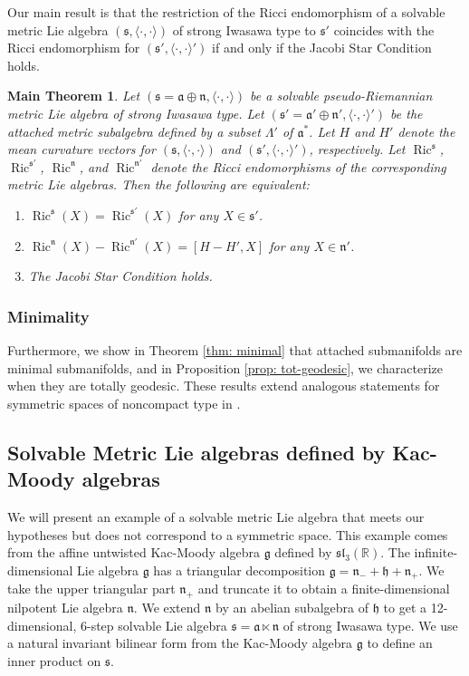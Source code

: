\documentclass[12pt]{amsart}
\newcommand\boldR{\ensuremath{\mathbb R}}
\newcommand{\fraka}{\ensuremath{\mathfrak{a}} }
\newcommand{\frakg}{\ensuremath{\mathfrak{g}} }
\newcommand{\frakh}{\ensuremath{\mathfrak{h}} }
\newcommand{\frakn}{\ensuremath{\mathfrak{n}} }
\newcommand{\fraks}{\ensuremath{\mathfrak{s}} }
\newcommand\fraksl{{\mathfrak{sl}}}
\newcommand\n{{\mathfrak{n}}}
\newcommand\s{{\mathfrak{s}}}
\newcommand\ip{{\langle\cdot {,} \cdot\rangle}}
\newcommand{\Ric}{\operatorname{Ric}}
\theoremstyle{plain}
\newtheorem*{main}{Main Theorem}
\theoremstyle{definition}
\theoremstyle{remark}
\numberwithin{equation}{section}
\numberwithin{theorem}{section}
\begin{document}
Our main result is that the restriction of the Ricci
   endomorphism of a solvable metric Lie algebra   $(\fraks,\ip)$ of strong Iwasawa type
   to $\fraks'$ coincides with the Ricci endomorphism for
   $(\fraks',\ip')$ if and only if the Jacobi Star Condition holds.  
   \begin{main}\label{thm: Ricci equal}
   Let $(\fraks = \fraka \oplus \frakn,\ip)$ be a solvable pseudo-Riemannian metric  Lie algebra
   of strong  Iwasawa type. 
   Let $(\fraks' = \fraka' \oplus \frakn', \ip')$ be the attached metric subalgebra defined by a subset $\Lambda'$ of $\fraka^\ast$.
Let $H$ and $H'$ denote the mean curvature vectors for $(\s,\ip)$ and $(\s',\ip')$, respectively.  Let $\Ric^\s$, $\Ric^{\s'}$, $\Ric^\n$, and $\Ric^{\n'}$ denote the Ricci endomorphisms of the corresponding metric Lie algebras. 
   Then the following are equivalent:
   \begin{enumerate}
       \item 
 ${\displaystyle \Ric^{\s}(X) = \Ric^{\s'}(X)}$   for any $X \in \s'$.
\item $\Ric^\n (X) - \Ric^{\n'} (X) =  [H - H', X]$ for any $X \in \n'$.
  \item The Jacobi Star Condition  holds. 
\end{enumerate}
\end{main}

\subsubsection{Minimality}

Furthermore, we show in Theorem \ref{thm: minimal} that attached
submanifolds are minimal submanifolds, and in Proposition \ref{prop: tot-geodesic},
we characterize when they are totally geodesic. These
results extend analogous statements for symmetric spaces of
noncompact type in \cite{tamaru-11}.


\subsection{Solvable Metric Lie algebras defined by  Kac-Moody algebras}
 We will present   an example of a solvable metric Lie algebra 
that meets our hypotheses but does not correspond to a symmetric space.
 This example comes from the affine untwisted Kac-Moody
algebra $\frakg$ defined by $\fraksl_3(\boldR).$ 
The infinite-dimensional Lie algebra $\frakg$ has a triangular decomposition
$\frakg = \frakn_- + \frakh + \frakn_+.$  We take the upper
triangular part $\frakn_+$ and truncate it to obtain a
finite-dimensional nilpotent Lie algebra $\frakn$.  We extend $\frakn$  by an
abelian  subalgebra of $\frakh$ to get a  12-dimensional, 6-step 
solvable Lie algebra $\fraks = \fraka \ltimes \frakn$ of strong Iwasawa type.  We use a natural invariant bilinear form from the Kac-Moody algebra $\frakg$ to define an inner product on $\fraks.$  
 
\end{document}
